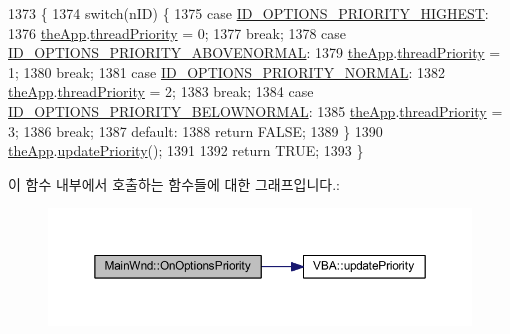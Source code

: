 \begin{DoxyCode}
1373 \{
1374   \textcolor{keywordflow}{switch}(nID) \{
1375   \textcolor{keywordflow}{case} \mbox{\hyperlink{resource_8h_a7d055b396f36189db72b4292a73ee67f}{ID\_OPTIONS\_PRIORITY\_HIGHEST}}:
1376     \mbox{\hyperlink{_v_b_a_8cpp_a8095a9d06b37a7efe3723f3218ad8fb3}{theApp}}.\mbox{\hyperlink{class_v_b_a_acde3a2cf1f42d8222850f9e8b5b28316}{threadPriority}} = 0;
1377     \textcolor{keywordflow}{break};
1378   \textcolor{keywordflow}{case} \mbox{\hyperlink{resource_8h_a4d644159c178aabdb8e518a5d4e16cae}{ID\_OPTIONS\_PRIORITY\_ABOVENORMAL}}:
1379     \mbox{\hyperlink{_v_b_a_8cpp_a8095a9d06b37a7efe3723f3218ad8fb3}{theApp}}.\mbox{\hyperlink{class_v_b_a_acde3a2cf1f42d8222850f9e8b5b28316}{threadPriority}} = 1;
1380     \textcolor{keywordflow}{break};
1381   \textcolor{keywordflow}{case} \mbox{\hyperlink{resource_8h_a53ed03b83c4843387c8c420b17f0234d}{ID\_OPTIONS\_PRIORITY\_NORMAL}}:
1382     \mbox{\hyperlink{_v_b_a_8cpp_a8095a9d06b37a7efe3723f3218ad8fb3}{theApp}}.\mbox{\hyperlink{class_v_b_a_acde3a2cf1f42d8222850f9e8b5b28316}{threadPriority}} = 2;
1383     \textcolor{keywordflow}{break};
1384   \textcolor{keywordflow}{case} \mbox{\hyperlink{resource_8h_a850581d49023ab9dce04b2ac4e669b8e}{ID\_OPTIONS\_PRIORITY\_BELOWNORMAL}}:
1385     \mbox{\hyperlink{_v_b_a_8cpp_a8095a9d06b37a7efe3723f3218ad8fb3}{theApp}}.\mbox{\hyperlink{class_v_b_a_acde3a2cf1f42d8222850f9e8b5b28316}{threadPriority}} = 3;
1386     \textcolor{keywordflow}{break};
1387   \textcolor{keywordflow}{default}:
1388     \textcolor{keywordflow}{return} FALSE;
1389   \}
1390   \mbox{\hyperlink{_v_b_a_8cpp_a8095a9d06b37a7efe3723f3218ad8fb3}{theApp}}.\mbox{\hyperlink{class_v_b_a_a82623f5ce8199b90e3a68fe8c8fee853}{updatePriority}}();
1391 
1392   \textcolor{keywordflow}{return} TRUE;
1393 \}
\end{DoxyCode}
이 함수 내부에서 호출하는 함수들에 대한 그래프입니다.\+:
\nopagebreak
\begin{figure}[H]
\begin{center}
\leavevmode
\includegraphics[width=350pt]{class_main_wnd_a98477c70a1ecbeacd3972419972d713e_cgraph}
\end{center}
\end{figure}
\mbox{\label{class_main_wnd_a8e81270ba800c278c27501dcf4ac7cf0}} 
